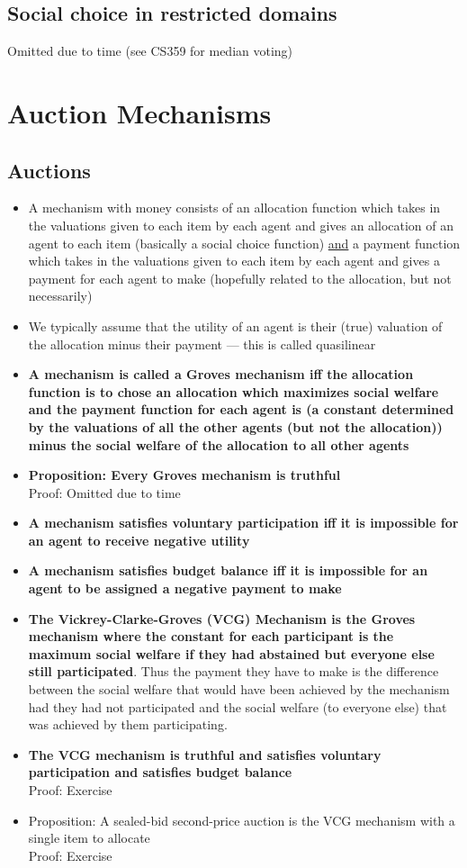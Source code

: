 \documentclass[20pt,a4paper,landscape]{extarticle}
\begin{document}
\begin{flushleft}
\subsection{Social choice in restricted domains}
Omitted due to time (see CS359 for median voting)
\clearpage
\section{Auction Mechanisms}
\subsection{Auctions}
\begin{itemize}
\item A mechanism with money consists of an allocation function which takes in the valuations given to each item by each agent and gives an allocation of an agent to each item (basically a social choice function) \underline{and} a payment function which takes in the valuations given to each item by each agent and gives a payment for each agent to make (hopefully related to the allocation, but not necessarily)
\item We typically assume that the utility of an agent is their (true) valuation of the allocation minus their payment --- this is called quasilinear
\clearpage
\item \textbf{A mechanism is called a Groves mechanism iff the allocation function is to chose an allocation which maximizes social welfare and the payment function for each agent is (a constant determined by the valuations of all the other agents (but not the allocation)) minus the social welfare of the allocation to all other agents}
\item \textbf{Proposition: Every Groves mechanism is truthful}\\
Proof: Omitted due to time
\item \textbf{A mechanism satisfies voluntary participation iff it is impossible for an agent to receive negative utility}
\item \textbf{A mechanism satisfies budget balance iff it is impossible for an agent to be assigned a negative payment to make}
\clearpage
\item \textbf{The Vickrey-Clarke-Groves (VCG) Mechanism is the Groves mechanism where the constant for each participant is the maximum social welfare if they had abstained but everyone else still participated}. Thus the payment they have to make is the difference between the social welfare that would have been achieved by the mechanism had they had not participated and the social welfare (to everyone else) that was achieved by them participating.
\item \textbf{The VCG mechanism is truthful and satisfies voluntary participation and satisfies budget balance}\\
Proof: Exercise
\item Proposition: A sealed-bid second-price auction is the VCG mechanism with a single item to allocate\\
Proof: Exercise
\end{itemize}

\end{flushleft}
\end{document}
